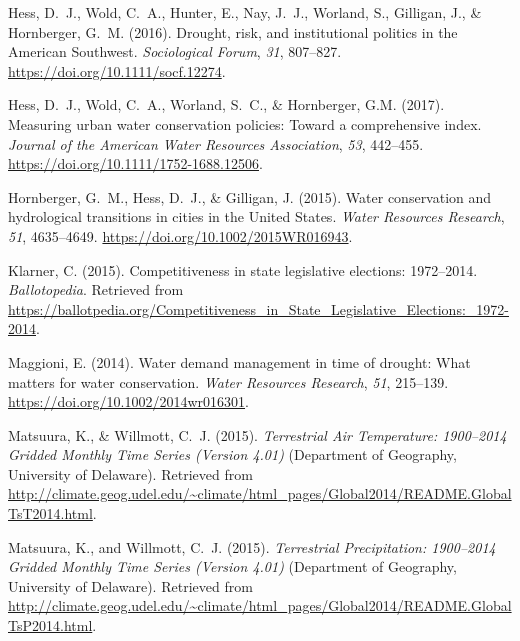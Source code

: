 \documentclass[draft,linenumbers]{agujournal}\usepackage{knitr}
\begin{document}
\begin{thebibliography}{33}
  Hess, D.~J., Wold, C.~A., Hunter, E., Nay, J.~J., Worland, S., Gilligan, J.,
  \& Hornberger, G.~M. (2016).
  Drought, risk, and institutional politics in the {A}merican {S}outhwest.
  \textit{Sociological Forum}, \textit{31}, 807--827.
  \url{https://doi.org/10.1111/socf.12274}.

  Hess, D.~J., Wold, C.~A., Worland, S.~C., \& Hornberger, G.M. (2017).
  Measuring urban water conservation policies: Toward a comprehensive index.
  \textit{Journal of the American Water Resources Association},
  \textit{53}, 442--455.
  \url{https://doi.org/10.1111/1752-1688.12506}.

  Hornberger, G.~M., Hess, D.~J., \& Gilligan, J. (2015).
  Water conservation and hydrological transitions in cities in the {U}nited {S}tates.
  \textit{Water Resources Research}, \textit{51}, 4635--4649.
  \url{https://doi.org/10.1002/2015WR016943}.

  Klarner, C. (2015).
  Competitiveness in state legislative elections: 1972--2014.
  \textit{Ballotopedia}.
  Retrieved from
  \url{https://ballotpedia.org/Competitiveness_in_State_Legislative_Elections:_1972-2014}.

  Maggioni, E. (2014).
  Water demand management in time of drought: {W}hat matters for water conservation.
  \textit{Water Resources Research}, \textit{51}, 215--139.
  \url{https://doi.org/10.1002/2014wr016301}.

  Matsuura, K., \& Willmott, C.~J. (2015{}).
  \textit{Terrestrial Air Temperature: 1900--2014 Gridded Monthly Time Series (Version 4.01)\/}
  (Department of  Geography, University of Delaware).
  Retrieved from
  \url{http://climate.geog.udel.edu/~climate/html_pages/Global2014/README.GlobalTsT2014.html}.

  Matsuura, K., and Willmott, C.~J. (2015{}).
  \textit{Terrestrial Precipitation: 1900--2014 Gridded Monthly Time Series (Version 4.01)\/}
  (Department of  Geography, University of Delaware).
  Retrieved from
  \url{http://climate.geog.udel.edu/~climate/html_pages/Global2014/README.GlobalTsP2014.html}.


\end{thebibliography}
\end{document}
